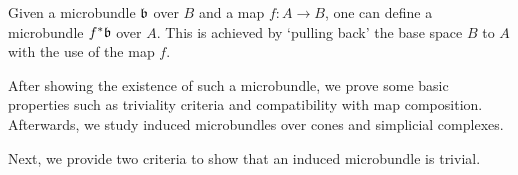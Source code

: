 \begin{myparagraph}
    Given a microbundle $\bb$ over $B$ and a map $f: A \to B$,
    one can define a microbundle $\ind{f}\bb$ over $A$.
    This is achieved by `pulling back' the base space $B$ to $A$
    with the use of the map $f$.

    After showing the existence of such a microbundle,
    we prove some basic properties
    such as triviality criteria and compatibility with map composition.
    Afterwards, we study induced microbundles
    over cones and simplicial complexes.
\end{myparagraph}


\begin{myparagraph}
    Next, we provide two criteria
    to show that an induced microbundle is trivial.
\end{myparagraph}





